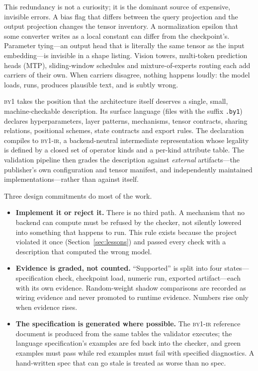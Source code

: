 \documentclass[11pt,a4paper]{article}
\newcommand{\code}[1]{\texttt{#1}}
\newcommand{\byone}{\textsc{by1}}
\newcommand{\ir}{\textsc{by1-ir}}
\newcommand{\q}[1]{\textquotedblleft #1\textquotedblright}
\begin{document}
This redundancy is not a curiosity; it is the dominant source of expensive,
invisible errors. A bias flag that differs between the query projection and the
output projection changes the tensor inventory. A normalization epsilon that
some converter writes as a local constant can differ from the checkpoint's.
Parameter tying---an output head that is literally the same tensor as the input
embedding---is invisible in a shape listing. Vision towers, multi-token
prediction heads (MTP), sliding-window schedules and mixture-of-experts
routing each add carriers of their own. When carriers disagree, nothing
happens loudly: the model loads, runs, produces plausible text, and is subtly
wrong.

\byone{} takes the position that the architecture itself deserves a single,
small, machine-checkable description. Its surface language (files with the
suffix \code{.by1}) declares hyperparameters, layer patterns, mechanisms,
tensor contracts, sharing relations, positional schemes, state contracts and
export rules. The declaration compiles to \ir{}, a backend-neutral intermediate
representation whose legality is defined by a closed set of operator kinds and
a per-kind attribute table. The validation pipeline then grades the
description against \emph{external} artifacts---the publisher's own
configuration and tensor manifest, and independently maintained
implementations---rather than against itself.

Three design commitments do most of the work.

\begin{itemize}
  \item \textbf{Implement it or reject it.} There is no third path. A
  mechanism that no backend can compute must be refused by the checker, not
  silently lowered into something that happens to run. This rule exists
  because the project violated it once (Section~\ref{sec:lessons}) and passed
  every check with a description that computed the wrong model.
  \item \textbf{Evidence is graded, not counted.} \q{Supported} is split into
  four states---specification check, checkpoint load, numeric run, exported
  artifact---each with its own evidence. Random-weight shadow comparisons are
  recorded as wiring evidence and never promoted to runtime evidence. Numbers
  rise only when evidence rises.
  \item \textbf{The specification is generated where possible.} The \ir{}
  reference document is produced from the same tables the validator executes;
  the language specification's examples are fed back into the checker, and
  green examples must pass while red examples must fail with specified
  diagnostics. A hand-written spec that can go stale is treated as worse than
  no spec.
\end{itemize}
\end{document}
